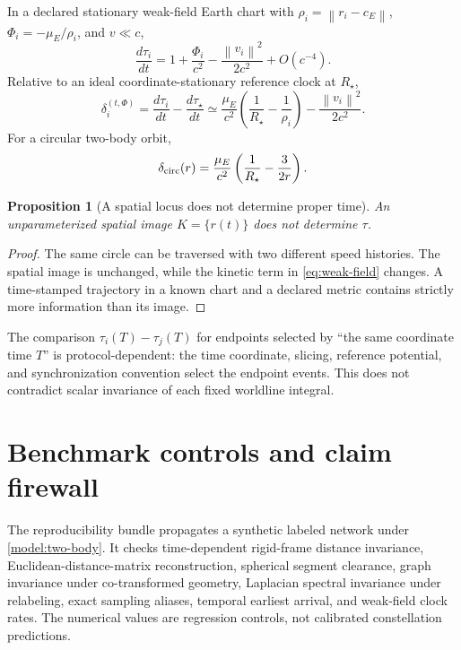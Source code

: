 \documentclass[11pt,a4paper]{article}
\theoremstyle{definition}
\theoremstyle{plain}
\newtheorem{proposition}[definition]{Proposition}
\theoremstyle{remark}
\newcommand{\norm}[1]{\left\lVert #1\right\rVert}
\begin{document}
In a declared stationary weak-field Earth chart with
\(\rho_i=\norm{r_i-c_E}\),
\(\Phi_i=-\mu_E/\rho_i\), and \(v\ll c\),
\begin{equation}\label{eq:weak-field}
\frac{d\tau_i}{dt}
=1+\frac{\Phi_i}{c^2}
-\frac{\norm{v_i}^2}{2c^2}
+O(c^{-4}).
\end{equation}
Relative to an ideal coordinate-stationary reference clock at
\(R_\star\),
\begin{equation}\label{eq:clock-offset}
\delta_i^{(t,\Phi)}
=\frac{d\tau_i}{dt}-\frac{d\tau_\star}{dt}
\simeq
\frac{\mu_E}{c^2}
\left(\frac1{R_\star}-\frac1{\rho_i}\right)
-\frac{\norm{v_i}^2}{2c^2}.
\end{equation}
For a circular two-body orbit,
\begin{equation}\label{eq:circular-offset}
\delta_{\rm circ}(r)
=\frac{\mu_E}{c^2}
\left(\frac1{R_\star}-\frac{3}{2r}\right).
\end{equation}

\begin{proposition}[A spatial locus does not determine proper time]
\label{prop:locus-clock}
An unparameterized spatial image \(K=\{r(t)\}\) does not determine
\(\tau\).
\end{proposition}

\begin{proof}
The same circle can be traversed with two different speed histories.
The spatial image is unchanged, while the kinetic term in
\cref{eq:weak-field} changes.  A time-stamped trajectory in a known
chart and a declared metric contains strictly more information than
its image.
\end{proof}

The comparison
\(\tau_i(T)-\tau_j(T)\) for endpoints selected by ``the same
coordinate time \(T\)'' is protocol-dependent: the time coordinate,
slicing, reference potential, and synchronization convention select
the endpoint events.  This does not contradict scalar invariance of
each fixed worldline integral.

\section{Benchmark controls and claim firewall}

The reproducibility bundle propagates a synthetic labeled network
under \cref{model:two-body}.  It checks time-dependent rigid-frame
distance invariance, Euclidean-distance-matrix reconstruction,
spherical segment clearance, graph invariance under co-transformed
geometry, Laplacian spectral invariance under relabeling, exact
sampling aliases, temporal earliest arrival, and weak-field clock
rates.  The numerical values are regression controls, not calibrated
constellation predictions.
\end{document}
